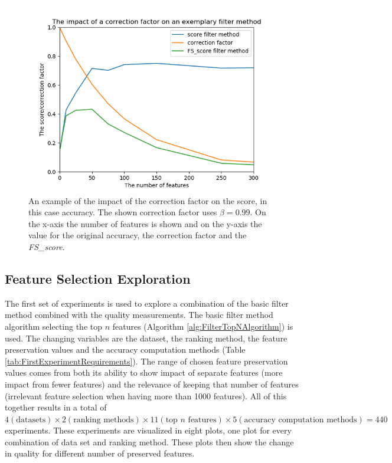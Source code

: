 \documentclass[10pt,a4paper]{report}
\begin{document}
	\begin{figure}[H]
		\includegraphics[]{FS_accuracy_example.png}
		\caption{An example of the impact of the correction factor on the score, in this case accuracy. The shown correction factor uses $\beta = 0.99$. On the x-axis the number of features is shown and on the y-axis the value for the original accuracy, the correction factor and the \textit{FS\_score}.}
		\label{fig:FSAccuracyExample}
	\end{figure}
	
	\subsection{Feature Selection Exploration}
	\label{FSsubsec:FeatureSelectionExploration}
	
	The first set of experiments is used to explore a combination of the basic filter method combined with the quality measurements. The basic filter method algorithm selecting the top $n$ features (Algorithm \ref{alg:FilterTopNAlgorithm}) is used. The changing variables are the dataset, the ranking method, the feature preservation values and the accuracy computation methods (Table \ref{tab:FirstExperimentRequirements}). The range of chosen feature preservation values comes from both its ability to show impact of separate features (more impact from fewer features) and the relevance of keeping that number of features (irrelevant feature selection when having more than 1000 features). All of this together results in a total of $4 (\text{datasets}) \times 2 (\text{ranking methods}) \times 11 (\text{top } n \text{ features}) \times 5 (\text{accuracy computation methods}) = 440$ experiments. These experiments are visualized in eight plots, one plot for every combination of data set and ranking method. These plots then show the change in quality for different number of preserved features.
	
\end{document}
